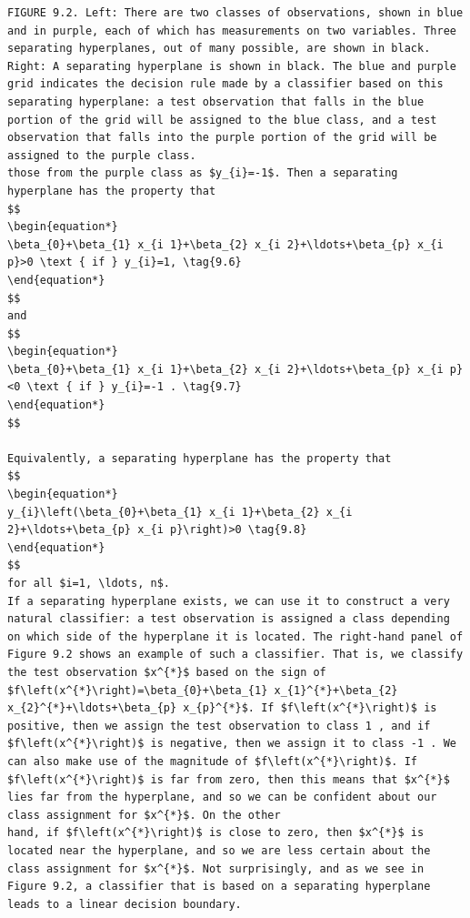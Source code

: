 \documentclass[10pt]{article}
\begin{document}
\begin{verbatim}
FIGURE 9.2. Left: There are two classes of observations, shown in blue and in purple, each of which has measurements on two variables. Three separating hyperplanes, out of many possible, are shown in black. Right: A separating hyperplane is shown in black. The blue and purple grid indicates the decision rule made by a classifier based on this separating hyperplane: a test observation that falls in the blue portion of the grid will be assigned to the blue class, and a test observation that falls into the purple portion of the grid will be assigned to the purple class.
those from the purple class as $y_{i}=-1$. Then a separating hyperplane has the property that
$$
\begin{equation*}
\beta_{0}+\beta_{1} x_{i 1}+\beta_{2} x_{i 2}+\ldots+\beta_{p} x_{i p}>0 \text { if } y_{i}=1, \tag{9.6}
\end{equation*}
$$
and
$$
\begin{equation*}
\beta_{0}+\beta_{1} x_{i 1}+\beta_{2} x_{i 2}+\ldots+\beta_{p} x_{i p}<0 \text { if } y_{i}=-1 . \tag{9.7}
\end{equation*}
$$

Equivalently, a separating hyperplane has the property that
$$
\begin{equation*}
y_{i}\left(\beta_{0}+\beta_{1} x_{i 1}+\beta_{2} x_{i 2}+\ldots+\beta_{p} x_{i p}\right)>0 \tag{9.8}
\end{equation*}
$$
for all $i=1, \ldots, n$.
If a separating hyperplane exists, we can use it to construct a very natural classifier: a test observation is assigned a class depending on which side of the hyperplane it is located. The right-hand panel of Figure 9.2 shows an example of such a classifier. That is, we classify the test observation $x^{*}$ based on the sign of $f\left(x^{*}\right)=\beta_{0}+\beta_{1} x_{1}^{*}+\beta_{2} x_{2}^{*}+\ldots+\beta_{p} x_{p}^{*}$. If $f\left(x^{*}\right)$ is positive, then we assign the test observation to class 1 , and if $f\left(x^{*}\right)$ is negative, then we assign it to class -1 . We can also make use of the magnitude of $f\left(x^{*}\right)$. If $f\left(x^{*}\right)$ is far from zero, then this means that $x^{*}$ lies far from the hyperplane, and so we can be confident about our class assignment for $x^{*}$. On the other
hand, if $f\left(x^{*}\right)$ is close to zero, then $x^{*}$ is located near the hyperplane, and so we are less certain about the class assignment for $x^{*}$. Not surprisingly, and as we see in Figure 9.2, a classifier that is based on a separating hyperplane leads to a linear decision boundary.


\end{verbatim}
\end{document}

